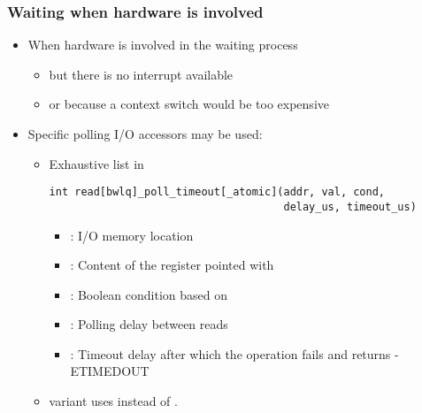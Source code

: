 \begin{frame}[fragile]
  \frametitle{Waiting when hardware is involved}
  \begin{itemize}
  \item When hardware is involved in the waiting process
    \begin{itemize}
    \item but there is no interrupt available
    \item or because a context switch would be too expensive
    \end{itemize}
  \item Specific polling I/O accessors may be used:
    \begin{itemize}
    \item Exhaustive list in 
      \begin{verbatim}
int read[bwlq]_poll_timeout[_atomic](addr, val, cond,
                                     delay_us, timeout_us)
      \end{verbatim}
        \begin{itemize}
        \item {}: I/O memory location
        \item {}: Content of the register pointed with
        \item {}: Boolean condition based on 
        \item {}: Polling delay between reads
        \item {}: Timeout delay after which the operation
          fails and returns -ETIMEDOUT
        \end{itemize}
        \item {} variant uses  instead of .
    \end{itemize}
  \end{itemize}
\end{frame}
